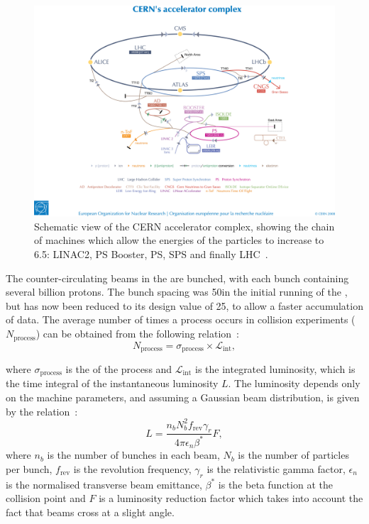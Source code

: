 \begin{figure}[h]
\centering
\includegraphics[width=1.0\textwidth]{detectorFigures/accelerators.jpg}
\caption[Schematic view of the CERN accelerator complex, showing the chain of machines which allow the energies of the particles to increase to 6.5\TeV: LINAC2, PS Booster, PS, SPS and finally LHC\quad\cite{Christiane:1260465}.]{Schematic view of the CERN accelerator complex, showing the chain of machines which allow the energies of the particles to increase to 6.5\TeV: LINAC2, PS Booster, PS, SPS and finally LHC~\cite{Christiane:1260465}.}
\label{fig:accelerators}
\end{figure}

The counter-circulating beams in the \LHC are bunched, with each bunch containing several billion protons. The bunch spacing was 50\ns in the initial running of the \LHC, but has now been reduced to its design value of 25\ns, to allow a faster accumulation of data. The average number of times a process occurs in collision experiments ($N_{\text{process}}$) can be obtained from the following relation~\cite{Benedikt:823808}:
\begin{equation}
\label{eq:NeqSigmaL}
N_{\text{process}} = \sigma_{\text{process}}\times \mathcal{L}_{\text{int}},
\end{equation}

where $\sigma_{\text{process}}$ is the \crosssection of the process and $\mathcal{L}_{\text{int}}$ is the integrated luminosity, which is the time integral of the instantaneous luminosity $L$. The luminosity depends only on the machine parameters, and assuming a Gaussian beam distribution, is given by the relation~\cite{Benedikt:823808}:
\begin{equation}
\label{eq:NeqSigmaL}
L = \frac{n_{b} N^{2}_{b} f_{\text{rev}} \gamma_{r}}{4 \pi \epsilon_{n} \beta^{*}} F,
\end{equation}
where $n_{b}$ is the number of bunches in each beam, $N_{b}$ is the number of particles per bunch, $f_{\text{rev}}$ is the revolution frequency, $\gamma_{r}$ is the relativistic gamma factor, $\epsilon_{n}$ is the normalised transverse beam emittance, $\beta^{*}$ is the beta function at the collision point and $F$ is a luminosity reduction factor which takes into account the fact that beams cross at a slight angle. 

